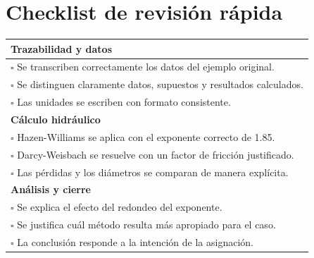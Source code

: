 \documentclass[12pt]{article}
\begin{document}
\section{Checklist de revisión rápida}
\begin{longtable}{p{}}
\toprule
\textbf{Trazabilidad y datos} \\
\midrule
$\square$ Se transcriben correctamente los datos del ejemplo original. \\
$\square$ Se distinguen claramente datos, supuestos y resultados calculados. \\
$\square$ Las unidades se escriben con formato consistente. \\
\midrule
\textbf{Cálculo hidráulico} \\
\midrule
$\square$ Hazen-Williams se aplica con el exponente correcto de \num{1.85}. \\
$\square$ Darcy-Weisbach se resuelve con un factor de fricción justificado. \\
$\square$ Las pérdidas y los diámetros se comparan de manera explícita. \\
\midrule
\textbf{Análisis y cierre} \\
\midrule
$\square$ Se explica el efecto del redondeo del exponente. \\
$\square$ Se justifica cuál método resulta más apropiado para el caso. \\
$\square$ La conclusión responde a la intención de la asignación. \\
\bottomrule
\end{longtable}
\end{document}
